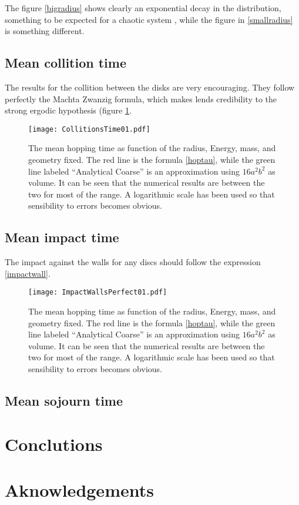 \documentclass[a4paper,10pt, jcp, aps, preprint]{revtex4-1}
\begin{document}
The figure \ref{bigradius} shows clearly an exponential decay in the
distribution, something to be expected for a chaotic system \cite{OttLibro} , while the
figure in \ref{smallradius} is something different. 

\subsection{Mean collition time}

The results for the collition between the disks are very encouraging. They follow
perfectly the Machta Zwanzig formula, which makes lends credibility to the
strong ergodic hypothesis (figure \ref{MeanHop01}.

\begin{figure}[h]
  \centering
  \texttt{[image: CollitionsTime01.pdf]}
  \caption{The mean hopping time as function of the radius, Energy, mass, 
    and geometry fixed.
    The red line is the formula \ref{hoptau}, while the green line
    labeled ``Analytical Coarse'' is an approximation using
    $16a^2b^2$ as volume. It can be seen that the numerical results
    are between the two for most of the range.
    A logarithmic scale
    has been used so that sensibility to errors becomes obvious.}\label{MeanHop01}
\end{figure}
 

\subsection{Mean impact time}

The impact against the walls for any discs should follow the expression 
\ref{impactwall}. 

\begin{figure}[h]
  \centering
  \texttt{[image: ImpactWallsPerfect01.pdf]}
  \caption{The mean hopping time as function of the radius, Energy, mass, 
    and geometry fixed.
    The red line is the formula \ref{hoptau}, while the green line
    labeled ``Analytical Coarse'' is an approximation using
    $16a^2b^2$ as volume. It can be seen that the numerical results
    are between the two for most of the range.
    A logarithmic scale
    has been used so that sensibility to errors becomes obvious.}\label{MeanColl01}
\end{figure}
 

\subsection{Mean sojourn time}


\section{Conclutions}

\section{Aknowledgements}



\end{document}
